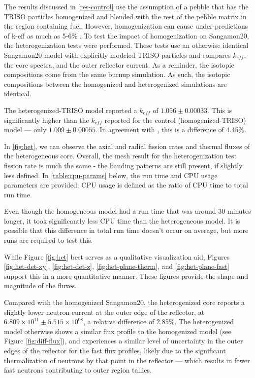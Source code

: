 The results discussed in \autoref{res-control} use the assumption of a pebble that has the TRISO particles homogenized and blended with the rest of the pebble matrix in the region containing fuel.  However, homogenization can cause under-predictions of k-eff as much as 5-6\% \cite{brown_stochastic_2005}.  To test the impact of homogenization on Sangamon20, the heterogenization tests were performed.  These tests use an otherwise identical Sangamon20 model with explicitly modeled TRISO particles and compares $k_{eff}$, the core spectra, and the outer reflector current.  As a reminder, the isotopic compositions come from the same burnup simulation.  As such, the isotopic compositions between the homogenized and heterogenized simulations are identical.




The heterogenized-TRISO model reported a $k_{eff}$ of $1.056 \pm 0.00033$.  This is significantly higher than the $k_{eff}$ reported for the control (homogenized-TRISO) model --- only $1.009 \pm 0.00055$.  In agreement with \cite{brown_stochastic_2005}, this is a difference of 4.45\%.  

In \ref{fig:het}, we can observe the axial and radial fission rates and thermal fluxes of the heterogeneous core.  Overall, the mesh result for the heterogenization test fission rate is much the same - the banding patterns are still present, if slightly less defined.  In \ref{table:cpu-params} below, the run time and CPU usage parameters are provided.  CPU usage is defined as the ratio of CPU time to total run time.



Even though the homogeneous model had a run time that was around 30 minutes longer, it took significantly less CPU time than the heterogeneous model.  It is possible that this difference in total run time doesn't occur on average, but more runs are required to test this.

While Figure \ref{fig:het} best serves as a qualitative visualization aid, Figures \ref{fig:het-det-xy}, \ref{fig:het-det-z}, \ref{fig:het-plane-therm}, and \ref{fig:het-plane-fast} support this in a more quantitative manner.  These figures provide the shape and magnitude of the fluxes.




Compared with the homogenized Sangamon20, the heterogenized core reports a slightly lower neutron current at the outer edge of the reflector, at $6.809\times10^{11} \pm 5.515\times10^{08}$, a relative difference of 2.85\%.  The heterogenized model otherwise shows a similar flux profile to the homogenized model (see Figure \ref{fig:diff-flux}), and experiences a similar level of uncertainty in the outer edges of the reflector for the fast flux profiles, likely due to the significant thermalization of neutrons by that point in the reflector --- which results in fewer fast neutrons contributing to outer region tallies.


